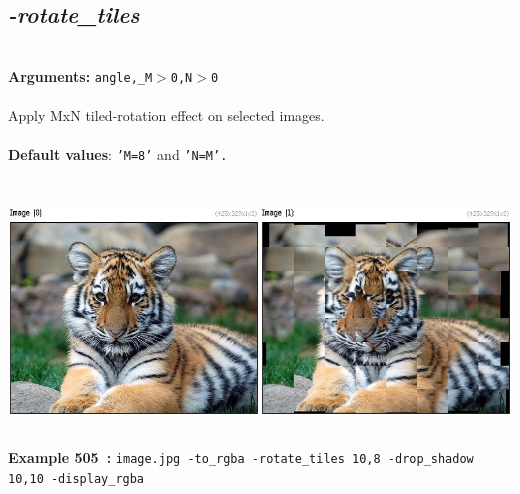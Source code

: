 \documentclass[a4paper,11pt,twoside]{book}
\begin{document}
\subsection{\emph{-rotate\_tiles} }\vspace*{-0.5em}
~\\\textbf{Arguments: } 
{\small \texttt{angle,\_M$>$0,N$>$0}}\\~\\
Apply MxN tiled-rotation effect on selected images.
~\\~\\\textbf{Default values}: {\small \texttt{'M=8'} and \texttt{'N=M'.}}
\begin{center}\includegraphics[keepaspectratio=true,height=7cm,width=\textwidth]{img/gmic_def505.jpg}\\
{\footnotesize \textbf{Example 505~:} \texttt{image.jpg -to\_rgba -rotate\_tiles 10,8 -drop\_shadow 10,10 -display\_rgba}}
\end{center}
\end{document}
